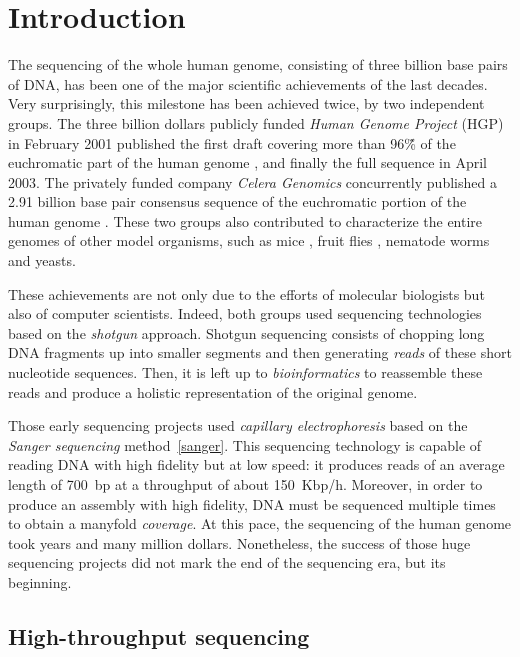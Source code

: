 \chapter{Introduction}

The sequencing of the whole human genome, consisting of three billion base pairs of DNA, has been one of the major scientific achievements of the last decades.
Very surprisingly, this milestone has been achieved twice, by two independent groups.
The three billion dollars publicly funded \emph{Human Genome Project} (HGP) in February 2001 published the first draft covering more than 96\~\% of the euchromatic part of the human genome \citep{hgp}, and finally the full sequence in April 2003.
The privately funded company \emph{Celera Genomics} concurrently published a 2.91 billion base pair consensus sequence of the euchromatic portion of the human genome \citep{celerahuman}.
These two groups also contributed to characterize the entire genomes of other model organisms, such as mice \citep{mouse}, fruit flies \citep{celerafly}, nematode worms and yeasts.

These achievements are not only due to the efforts of molecular biologists but also of computer scientists.
Indeed, both groups used sequencing technologies based on the \emph{shotgun} approach.
Shotgun sequencing consists of chopping long DNA fragments up into smaller segments and then generating \emph{reads} of these short nucleotide sequences.
Then, it is left up to \emph{bioinformatics} to reassemble these reads and produce a holistic representation of the original genome.

Those early sequencing projects used \emph{capillary electrophoresis} based on the \emph{Sanger sequencing} method~\ref{sanger}.
This sequencing technology is capable of reading DNA with high fidelity but at low speed: it produces reads of an average length of 700~bp at a throughput of about 150~Kbp/h.
Moreover, in order to produce an assembly with high fidelity, DNA must be sequenced multiple times to obtain a manyfold \emph{coverage}.
At this pace, the sequencing of the human genome took years and many million dollars.
Nonetheless, the success of those huge sequencing projects did not mark the end of the sequencing era, but its beginning.


\section{High-throughput sequencing}

